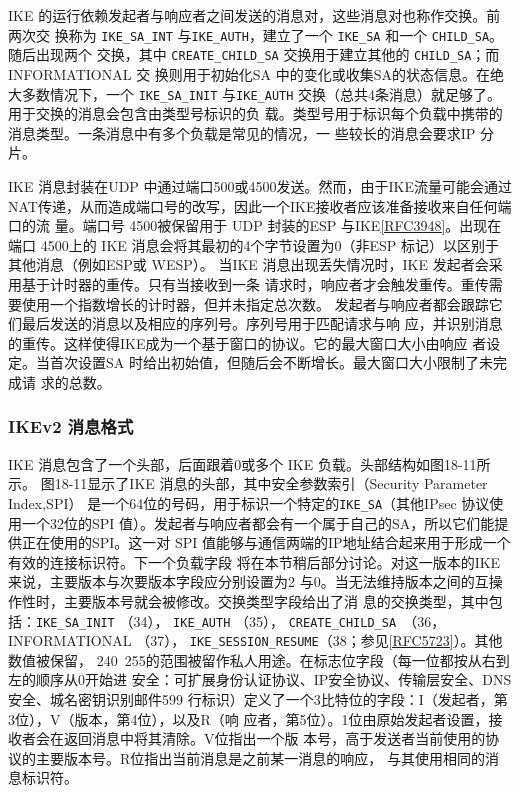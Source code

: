 IKE 的运行依赖发起者与响应者之间发送的消息对，这些消息对也称作交换。前两次交
换称为 \verb|IKE_SA_INT| 与\verb|IKE_AUTH|，建立了一个 \verb|IKE_SA| 和一个 \verb|CHILD_SA|。随后出现两个
交换，其中 \verb|CREATE_CHILD_SA| 交换用于建立其他的 \verb|CHILD_SA|；而 INFORMATIONAL 交
换则用于初始化SA 中的变化或收集SA的状态信息。在绝大多数情况下，一个 \verb|IKE_SA_INIT|
与\verb|IKE_AUTH| 交换（总共4条消息）就足够了。用于交换的消息会包含由类型号标识的负
载。类型号用于标识每个负载中携带的消息类型。一条消息中有多个负载是常见的情况，一
些较长的消息会要求IP 分片。

IKE 消息封装在UDP 中通过端口500或4500发送。然而，由于IKE流量可能会通过
NAT传递，从而造成端口号的改写，因此一个IKE接收者应该准备接收来自任何端口的流
量。端口号 4500被保留用于 UDP 封装的ESP 与IKE\href{https://www.rfc-editor.org/rfc/rfc3948}{[RFC3948]}。出现在端口 4500上的 IKE
消息会将其最初的4个字节设置为0（非ESP 标记）以区别于其他消息（例如ESP或 WESP）。
当IKE 消息出现丢失情况时，IKE 发起者会采用基于计时器的重传。只有当接收到一条
请求时，响应者才会触发重传。重传需要使用一个指数增长的计时器，但并未指定总次数。
发起者与响应者都会跟踪它们最后发送的消息以及相应的序列号。序列号用于匹配请求与响
应，并识别消息的重传。这样使得IKE成为一个基于窗口的协议。它的最大窗口大小由响应
者设定。当首次设置SA 时给出初始值，但随后会不断增长。最大窗口大小限制了未完成请
求的总数。

\subsubsection{IKEv2 消息格式}
IKE 消息包含了一个头部，后面跟着0或多个 IKE 负载。头部结构如图18-11所示。
图18-11显示了IKE 消息的头部，其中安全参数索引（Security Parameter Index,SPI）
是一个64位的号码，用于标识一个特定的\verb|IKE_SA|（其他IPsec 协议使用一个32位的SPI
值）。发起者与响应者都会有一个属于自己的SA，所以它们能提供正在使用的SPI。这一对
SPI 值能够与通信两端的IP地址结合起来用于形成一个有效的连接标识符。下一个负载字段
将在本节稍后部分讨论。对这一版本的IKE来说，主要版本与次要版本字段应分别设置为2
与0。当无法维持版本之间的互操作性时，主要版本号就会被修改。交换类型字段给出了消
息的交换类型，其中包括：\verb|IKE_SA_INIT| （34）， \verb|IKE_AUTH| （35）， \verb|CREATE_CHILD_SA |（36，
INFORMATIONAL （37）， \verb|IKE_SESSION_RESUME|（38；参见\href{https://www.rfc-editor.org/rfc/rfc5723}{[RFC5723]}）。其他数值被保留，
240~255的范围被留作私人用途。在标志位字段（每一位都按从右到左的顺序从0开始进
安全：可扩展身份认证协议、IP安全协议、传输层安全、DNS 安全、城名密钥识别邮件599
行标识）定义了一个3比特位的字段：I（发起者，第3位），V（版本，第4位），以及R（响
应者，第5位）。1位由原始发起者设置，接收者会在返回消息中将其清除。V位指出一个版
本号，高于发送者当前使用的协议的主要版本号。R位指出当前消息是之前某一消息的响应，
与其使用相同的消息标识符。

